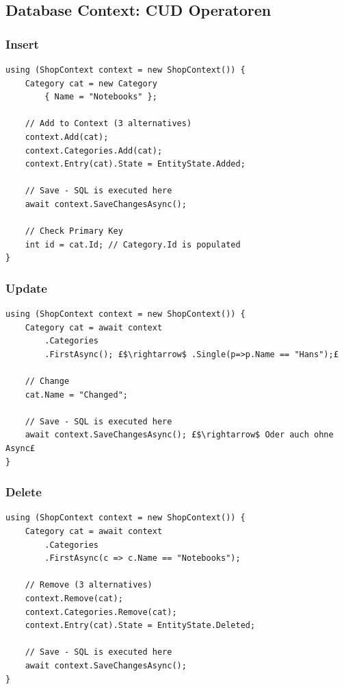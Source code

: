 \subsection{Database Context: CUD Operatoren}
\subsubsection{Insert}
\begin{lstlisting}
using (ShopContext context = new ShopContext()) {
    Category cat = new Category
        { Name = "Notebooks" };

    // Add to Context (3 alternatives)
    context.Add(cat);
    context.Categories.Add(cat);
    context.Entry(cat).State = EntityState.Added;

    // Save - SQL is executed here
    await context.SaveChangesAsync();

    // Check Primary Key
    int id = cat.Id; // Category.Id is populated
}
\end{lstlisting}

\subsubsection{Update}
\begin{lstlisting}
using (ShopContext context = new ShopContext()) {
    Category cat = await context
        .Categories
        .FirstAsync(); £$\rightarrow$ .Single(p=>p.Name == "Hans");£

    // Change
    cat.Name = "Changed";

    // Save - SQL is executed here
    await context.SaveChangesAsync(); £$\rightarrow$ Oder auch ohne Async£
}
\end{lstlisting}

\subsubsection{Delete}
\begin{lstlisting}
using (ShopContext context = new ShopContext()) {
    Category cat = await context
        .Categories
        .FirstAsync(c => c.Name == "Notebooks");

    // Remove (3 alternatives)
    context.Remove(cat);
    context.Categories.Remove(cat);
    context.Entry(cat).State = EntityState.Deleted;

    // Save - SQL is executed here
    await context.SaveChangesAsync();
}
\end{lstlisting}


